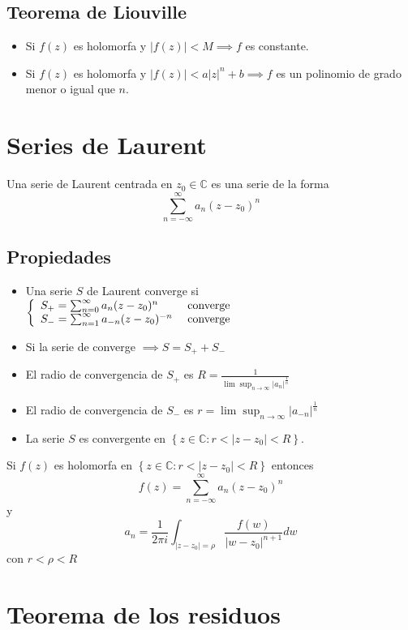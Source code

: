 \documentclass[paper=a4, fontsize=11pt]{scrartcl}
\numberwithin{equation}{section}
\numberwithin{figure}{section}
\numberwithin{table}{section}
\begin{document}
\subsection{Teorema de Liouville}
\begin{itemize}
\item Si $f(z)$ es holomorfa y $|f(z)|<M \implies f$ es constante.
\item Si $f(z)$ es holomorfa y $|f(z)|<a|z|^n + b \implies f$ es un polinomio de grado menor o igual que $n$.
\end{itemize}

\newpage
\section{Series de Laurent}
Una serie de Laurent centrada en $z_0\in\mathbb{C}$ es una serie de la forma
$$\sum_{n=-\infty}^\infty a_n(z-z_0)^n$$

\subsection{Propiedades}
\begin{itemize}
\item Una serie $S$ de Laurent converge si 
$\left\{\begin{array}{l l}
S_{+}=\sum_{n=0}^\infty a_n(z-z_0)^n & \text{ converge}\\
S_{-}=\sum_{n=1}^\infty a_{-n}(z-z_0)^{-n} &  \text{ converge}
\end{array}\right.$
\item Si la serie de converge $\implies S=S_++S_-$
\item El radio de convergencia de $S_+$ es $R = \frac{1}{\lim\sup_{n\to\infty} {|a_n|^{\frac{1}{n}}}}$
\item El radio de convergencia de $S_-$ es $r={\lim\sup_{n\to\infty} {|a_{-n}|^\frac{1}{n}}}$
\item La serie $S$ es convergente en $\left\{z\in\mathbb{C}: r<\left|z-z_0\right|<R\right\}$.
\end{itemize}

Si $f(z)$ es holomorfa en $\left\{z\in\mathbb{C}: r<\left|z-z_0\right|<R\right\}$
entonces
$$f(z) = \sum_{n=-\infty}^\infty a_n(z-z_0)^n$$
y
$$a_n = \frac{1}{2\pi i}\int_{|z-z_0|=\rho} \frac{f(w)}{|w-z_0|^{n+1}}dw$$
con $r<\rho<R$



\newpage
\section{Teorema de los residuos}
\end{document}
